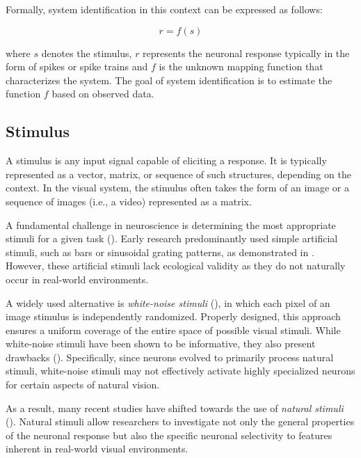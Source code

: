 Formally, system identification in this context can be expressed as follows:

\begin{equation}
    r = f(s)
\end{equation}
\label{eq:system_identification}

where $s$ denotes the stimulus, $r$ represents the neuronal response typically in the form of spikes or spike trains and $f$ is the unknown mapping function that characterizes the system. The goal of system identification is to estimate the function $f$ based on observed data.

\subsection{Stimulus}
\label{subsec:stimulus}

A stimulus is any input signal capable of eliciting a response. It is typically represented as a vector, matrix, or sequence of such structures, depending on the context. In the visual system, the stimulus often takes the form of an image or a sequence of images (i.e., a video) represented as a matrix.

A fundamental challenge in neuroscience is determining the most appropriate stimuli for a given task (\citet{Carandini10577}). Early research predominantly used simple artificial stimuli, such as bars or sinusoidal grating patterns, as demonstrated in \citet{hubel1965receptive}. However, these artificial stimuli lack ecological validity as they do not naturally occur in real-world environments.

A widely used alternative is \emph{white-noise stimuli} (\citet{dayan2005theoretical, chichilnisky2001simple}), in which each pixel of an image stimulus is independently randomized. Properly designed, this approach ensures a uniform coverage of the entire space of possible visual stimuli. While white-noise stimuli have been shown to be informative, they also present drawbacks (\citet{Talebi1560}). Specifically, since neurons evolved to primarily process natural stimuli, white-noise stimuli may not effectively activate highly specialized neurons for certain aspects of natural vision.

As a result, many recent studies have shifted towards the use of \emph{natural stimuli} (\citet{sonkusare2019naturalistic, lurz2020generalization, antolik2024comprehensive}). Natural stimuli allow researchers to investigate not only the general properties of the neuronal response but also the specific neuronal selectivity to features inherent in real-world visual environments.

